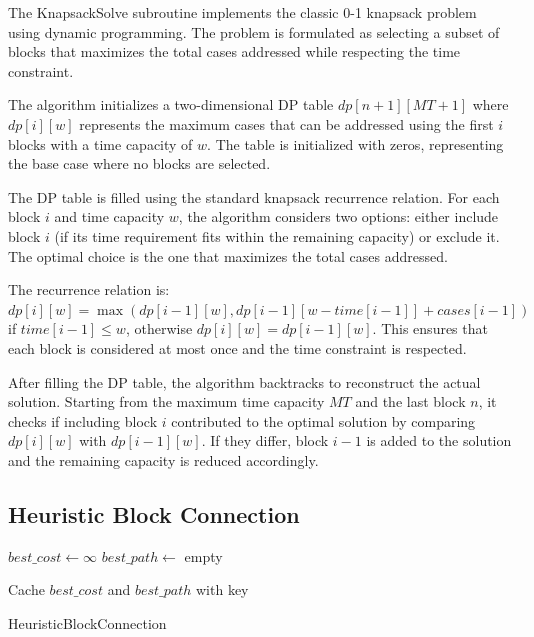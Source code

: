 The KnapsackSolve subroutine implements the classic 0-1 knapsack problem using dynamic programming.
The problem is formulated as selecting a subset of blocks that maximizes the total cases addressed
while respecting the time constraint.

The algorithm initializes a two-dimensional DP table $dp[n+1][MT+1]$ where $dp[i][w]$ represents the
maximum cases that can be addressed using the first $i$ blocks with a time capacity of $w$. The table
is initialized with zeros, representing the base case where no blocks are selected.

The DP table is filled using the standard knapsack recurrence relation. For each block $i$ and time
capacity $w$, the algorithm considers two options: either include block $i$ (if its time requirement
fits within the remaining capacity) or exclude it. The optimal choice is the one that maximizes the
total cases addressed.

The recurrence relation is: $dp[i][w] = \max(dp[i-1][w], dp[i-1][w-time[i-1]] + cases[i-1])$ if $time[i-1] \leq w$,
otherwise $dp[i][w] = dp[i-1][w]$. This ensures that each block is considered at most once and the
time constraint is respected.

After filling the DP table, the algorithm backtracks to reconstruct the actual solution. Starting from
the maximum time capacity $MT$ and the last block $n$, it checks if including block $i$ contributed to
the optimal solution by comparing $dp[i][w]$ with $dp[i-1][w]$. If they differ, block $i-1$ is added to
the solution and the remaining capacity is reduced accordingly.

\subsection{Heuristic Block Connection}

\begin{algorithm}[H]
	\SetAlgoLined


	$best\_cost \leftarrow \infty$\;
	$best\_path \leftarrow$ empty\;


	Cache $best\_cost$ and $best\_path$ with key\;
	\;
	\caption{HeuristicBlockConnection}
\end{algorithm}

